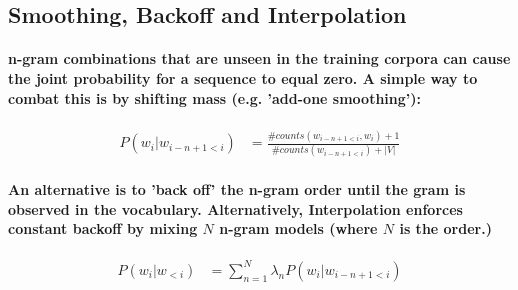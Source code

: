 \documentclass{article}
\begin{document}
\subsection{Smoothing, Backoff and Interpolation}

\paragraph{n-gram combinations that are unseen in the training corpora can cause the joint probability for a sequence to equal zero. A simple way to combat this is by shifting mass (e.g. 'add-one smoothing'):}
	\begin{align}
	P(w_i|w_{i-n+1 < i}) &= \frac{\# counts(w_{i-n+1 < i}, w_i)+1}{\# counts(w_{i-n+1 <i})+|V|}
	\end{align}
	\paragraph{An alternative is to 'back off' the n-gram order until the gram is observed in the vocabulary.  Alternatively, Interpolation enforces constant backoff by mixing $N$ n-gram models (where $N$ is the order.)}
	\begin{align}
	P(w_i|w_{<i}) &= \sum_{n=1}^N \lambda_n P(w_i|w_{i-n+1 < i})
	\end{align}
\end{document}

